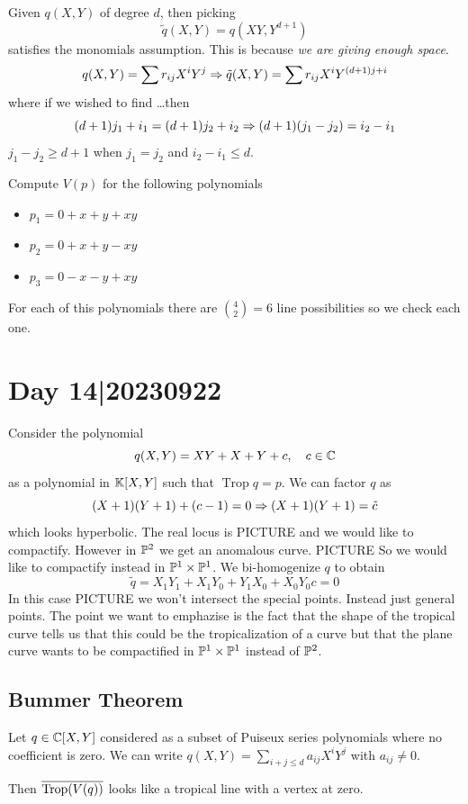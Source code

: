 \documentclass[12pt]{memoir}
\DeclareMathOperator{\Trop}{Trop}
\begin{document}
\begin{ptcb}
Given $q(X,Y)$ of degree $d$, then picking 
$$\tilde{q}(X,Y)=q(XY,Y^{d+1})$$
satisfies the monomials assumption. This is because \emph{we are giving enough space}.
$$q(X,Y)=\sum r_{ij}X^iY^j\Rightarrow \tilde{q}(X,Y)=\sum r_{ij}X^iY^{(d+1)j+i}$$
where if we wished to find \dots then 
$$(d+1)j_1+i_1=(d+1)j_2+i_2\Rightarrow (d+1)(j_1-j_2)=i_2-i_1$$
$j_1-j_2\geq d+1$ when $j_1=j_2$ and $i_2-i_1\leq d$.
\end{ptcb}

\begin{Ex}
    Compute $V(p)$ for the following polynomials
    \begin{itemize}
        \item $p_1=0+x+y+xy$
        \item $p_2=0+x+y-xy$
        \item $p_3=0-x-y+xy$
    \end{itemize}
    For each of this polynomials there are $\binom{4}{2}=6$ line possibilities so we check each one.
\end{Ex}

\section{Day 14|20230922}

Consider the polynomial 
$$q(X,Y)=XY+X+Y+c,\quad c\in\mathbb{C}$$
as a polynomial in $\mathbb{K}[X,Y]$ such that $\Trop q=p$. We can factor $q$ as 
$$(X+1)(Y+1)+(c-1)=0\Rightarrow(X+1)(Y+1)=\tilde{c}$$
which looks hyperbolic. The real locus is PICTURE and we would like to compactify. However in $\mathbb{P}^2$ we get an anomalous curve. PICTURE So we would like to compactify instead in $\mathbb{P}^1\times\mathbb{P}^1$.  We bi-homogenize $q$ to obtain 
$$\tilde{q}=X_1Y_1+X_1Y_0+Y_1X_0+X_0Y_0c=0$$ 
In this case PICTURE we won't intersect the special points. Instead just general points. The point we want to emphazise is the fact that the shape of the tropical curve tells us that this could be the tropicalization of  a curve but that the plane curve wants to be compactified in $\mathbb{P}^1\times\mathbb{P}^1$ instead of $\mathbb{P}^2$.

\subsection{Bummer Theorem}

\begin{Th} 
    Let $q\in\mathbb{C}[X,Y]$ considered as a subset of Puiseux series polynomials where no coefficient is zero. We can write $q(X,Y)=\sum_{i+j\leq d}a_{ij}X^iY^j$ with $a_{ij}\neq 0$.\par 
    Then $\ov{\Trop(V(q))}$ looks like a tropical line with a vertex at zero.
\end{Th}
\end{document}
